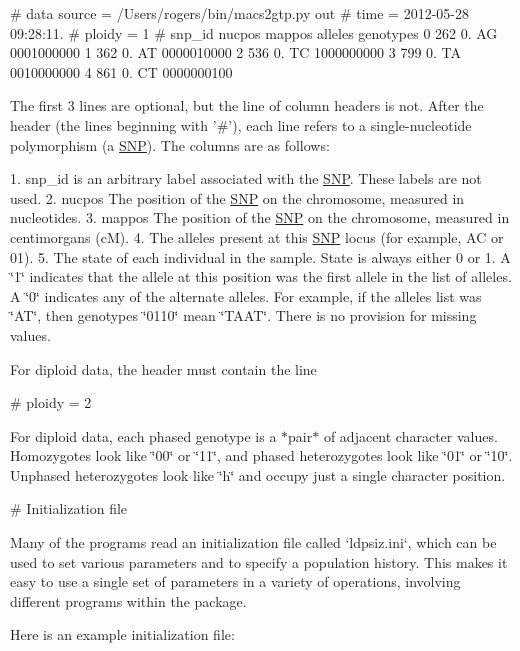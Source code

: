 \# data source = /\-Users/rogers/bin/macs2gtp.py out \# time = 2012-\/05-\/28 09\-:28\-:11. \# ploidy = 1 \# snp\-\_\-id nucpos mappos alleles genotypes 0 262 0. \-A\-G 0001000000 1 362 0. \-A\-T 0000010000 2 536 0. \-T\-C 1000000000 3 799 0. \-T\-A 0010000000 4 861 0. \-C\-T 0000000100

\-The first 3 lines are optional, but the line of column headers is not. \-After the header (the lines beginning with '\#'), each line refers to a single-\/nucleotide polymorphism (a \hyperlink{struct_s_n_p}{\-S\-N\-P}). \-The columns are as follows\-:

1. snp\-\_\-id is an arbitrary label associated with the \hyperlink{struct_s_n_p}{\-S\-N\-P}. \-These labels are not used. 2. nucpos \-The position of the \hyperlink{struct_s_n_p}{\-S\-N\-P} on the chromosome, measured in nucleotides. 3. mappos \-The position of the \hyperlink{struct_s_n_p}{\-S\-N\-P} on the chromosome, measured in centimorgans (c\-M). 4. \-The alleles present at this \hyperlink{struct_s_n_p}{\-S\-N\-P} locus (for example, \-A\-C or 01). 5. \-The state of each individual in the sample. \-State is always either 0 or 1. \-A \char`\"{}1\char`\"{} indicates that the allele at this position was the first allele in the list of alleles. \-A \char`\"{}0\char`\"{} indicates any of the alternate alleles. \-For example, if the alleles list was \char`\"{}\-A\-T\char`\"{}, then genotypes \char`\"{}0110\char`\"{} mean \char`\"{}\-T\-A\-A\-T\char`\"{}. \-There is no provision for missing values.

\-For diploid data, the header must contain the line

\# ploidy = 2

\-For diploid data, each phased genotype is a $\ast$pair$\ast$ of adjacent character values. \-Homozygotes look like \char`\"{}00\char`\"{} or \char`\"{}11\char`\"{}, and phased heterozygotes look like \char`\"{}01\char`\"{} or \char`\"{}10\char`\"{}. \-Unphased heterozygotes look like \char`\"{}h\char`\"{} and occupy just a single character position.

\# \-Initialization file

\-Many of the programs read an initialization file called `ldpsiz.ini`, which can be used to set various parameters and to specify a population history. \-This makes it easy to use a single set of parameters in a variety of operations, involving different programs within the package.

\-Here is an example initialization file\-:

